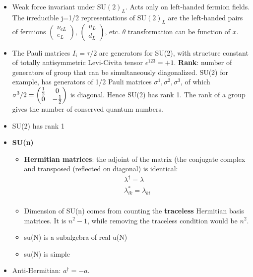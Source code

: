 \begin{itemize}
        \item Weak force invariant under $\text{SU}(2)_L$. Acts only on left-handed fermion fields. The irreducible j=1/2 representations of $\text{SU}(2)_L$ are the left-handed pairs of fermions $\begin{pmatrix}\nu_{eL}\\e_L\end{pmatrix}$, $\begin{pmatrix}u_L\\d_L\end{pmatrix}$, etc. $\theta$ transformation can be function of $x$. \cite{wells}
    \item The Pauli matrices $I_i=\tau/2$ are generators for SU(2), with structure constant of totally antisymmetric Levi-Civita tensor $\epsilon^{123}=+1$. \cite{hokim}
    \textbf{Rank}: number of generators of group that can be simultaneously diagonalized. SU(2) for example, has generators of 1/2 Pauli matrices $\sigma^1,\sigma^2,\sigma^3$, of which $\sigma^3/2=\begin{pmatrix}\frac{1}{2}&0\\0&-\frac{1}{2}\end{pmatrix}$ is diagonal. Hence SU(2) has rank 1. The rank of a group gives the number of conserved quantum numbers.
    \item SU(2) has rank 1 \cite{hokim}
    \item \textbf{SU(n)} \cite{pfeifer}
    \begin{itemize}
        \item \textbf{Hermitian matrices}: the adjoint of the matrix (the conjugate complex and transposed (reflected on diagonal) is identical: \cite{pfeifer}
        \begin{equation}\begin{split}
        \lambda^\dagger=\lambda \\
        \lambda^*_{ik}=\lambda_{ki} \\
        \end{split}\end{equation}
        \item Dimension of SU(n) comes from counting the \textbf{traceless} Hermitian basis matrices. It is $n^2-1$, while removing the traceless condition would be $n^2$. \cite{pfeifer}
        \item su(N) is a subalgebra of real u(N) \cite{pfeifer}
        \item su(N) is simple \cite{pfeifer}
    \end{itemize}
    \item Anti-Hermitian: $a^\dagger=-a$. \cite{pfeifer}
\end{itemize}


